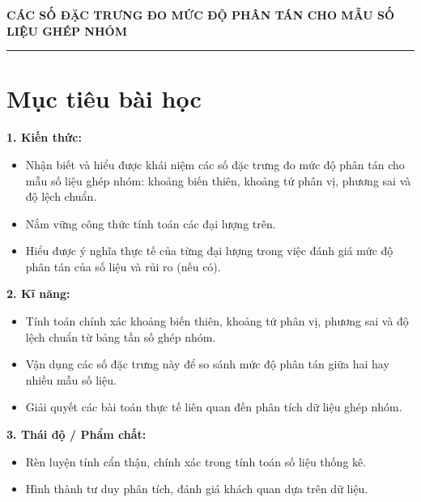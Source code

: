 \documentclass[12pt]{article}
\begin{document}
	
	\begin{center}
		{\LARGE \textbf{CÁC SỐ ĐẶC TRƯNG ĐO MỨC ĐỘ PHÂN TÁN CHO MẪU SỐ LIỆU GHÉP NHÓM}}\\[6pt]
	\end{center}
	\vspace{4mm}
	\hrule
	\vspace{4mm}
	
	\section*{Mục tiêu bài học}
	
	\textbf{1. Kiến thức:}
	\begin{itemize}
		\item Nhận biết và hiểu được khái niệm các số đặc trưng đo mức độ phân tán cho mẫu số liệu ghép nhóm: khoảng biến thiên, khoảng tứ phân vị, phương sai và độ lệch chuẩn.
		\item Nắm vững công thức tính toán các đại lượng trên.
		\item Hiểu được ý nghĩa thực tế của từng đại lượng trong việc đánh giá mức độ phân tán của số liệu và rủi ro (nếu có).
	\end{itemize}
	
	\noindent \textbf{2. Kĩ năng:}
	\begin{itemize}
		\item Tính toán chính xác khoảng biến thiên, khoảng tứ phân vị, phương sai và độ lệch chuẩn từ bảng tần số ghép nhóm.
		\item Vận dụng các số đặc trưng này để so sánh mức độ phân tán giữa hai hay nhiều mẫu số liệu.
		\item Giải quyết các bài toán thực tế liên quan đến phân tích dữ liệu ghép nhóm.
	\end{itemize}
	
	\noindent \textbf{3. Thái độ / Phẩm chất:}
	\begin{itemize}
		\item Rèn luyện tính cẩn thận, chính xác trong tính toán số liệu thống kê.
		\item Hình thành tư duy phân tích, đánh giá khách quan dựa trên dữ liệu.
	\end{itemize}
	
	\newpage
	
	\setcounter{tocdepth}{2}
	\tableofcontents
	\newpage
	
\end{document}
